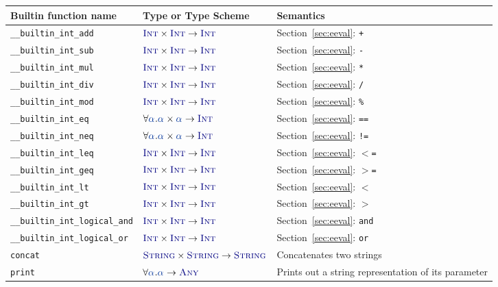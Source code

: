 \documentclass{article}
\newcommand{\vterminal}[1]{\textsf{\textcolor{dgreen}{\texttt{#1}}}}
\newcommand{\Ty}[1]{\textcolor{dblue}{#1}}
\newcommand{\TString}{\Ty{\textsc{String}}}
\newcommand{\TInt}{\Ty{\textsc{Int}}}
\newcommand{\TAny}{\Ty{\textsc{Any}}}
\newcommand{\tyva}[1][{}]{\textcolor{dbluez}{\ensuremath{\alpha_{#1}}}}
\begin{document}
\begin{tabular}{|l|l|p{5cm}|}
  \hline
  \textbf{Builtin function name} & \textbf{Type or Type Scheme} & \textbf{Semantics} \\
  \hline
  \hline
    \texttt{\_\_builtin\_int\_add} & $\TInt \times \TInt \to \TInt$ & Section~\ref{sec:eeval}: \vterminal{+} \\
  \hline
    \texttt{\_\_builtin\_int\_sub} & $\TInt \times \TInt \to \TInt$ & Section~\ref{sec:eeval}: \vterminal{-} \\
  \hline
    \texttt{\_\_builtin\_int\_mul} & $\TInt \times \TInt \to \TInt$ & Section~\ref{sec:eeval}: \vterminal{*} \\
  \hline
    \texttt{\_\_builtin\_int\_div} & $\TInt \times \TInt \to \TInt$ & Section~\ref{sec:eeval}: \vterminal{/} \\
  \hline
    \texttt{\_\_builtin\_int\_mod} & $\TInt \times \TInt \to \TInt$ & Section~\ref{sec:eeval}: \vterminal{\%} \\
  \hline
    \texttt{\_\_builtin\_int\_eq} & $\forall \tyva. \tyva \times \tyva \to \TInt$ & Section~\ref{sec:eeval}: \vterminal{==} \\
  \hline
    \texttt{\_\_builtin\_int\_neq} & $\forall \tyva. \tyva \times \tyva \to \TInt$ & Section~\ref{sec:eeval}: \vterminal{!=} \\
  \hline
    \texttt{\_\_builtin\_int\_leq} & $\TInt \times \TInt \to \TInt$ & Section~\ref{sec:eeval}: \vterminal{$<$=} \\
  \hline
    \texttt{\_\_builtin\_int\_geq} & $\TInt \times \TInt \to \TInt$ & Section~\ref{sec:eeval}: \vterminal{$>$=} \\
  \hline
    \texttt{\_\_builtin\_int\_lt} & $\TInt \times \TInt \to \TInt$ & Section~\ref{sec:eeval}: \vterminal{$<$} \\
  \hline
    \texttt{\_\_builtin\_int\_gt} & $\TInt \times \TInt \to \TInt$ & Section~\ref{sec:eeval}: \vterminal{$>$} \\
  \hline
    \texttt{\_\_builtin\_int\_logical\_and} & $\TInt \times \TInt \to \TInt$ & Section~\ref{sec:eeval}: \vterminal{and} \\
  \hline
    \texttt{\_\_builtin\_int\_logical\_or} & $\TInt \times \TInt \to \TInt$ & Section~\ref{sec:eeval}: \vterminal{or} \\
  \hline
    \texttt{concat} & $\TString \times \TString \to \TString$ & Concatenates two strings \\
  \hline
    \texttt{print} & $\forall \tyva . \tyva \to \TAny$ & Prints out a string representation of its parameter \\

\end{tabular}
\end{document}

